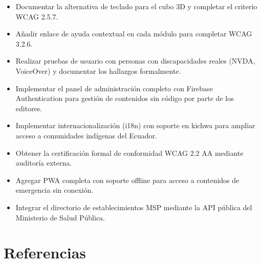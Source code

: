 \documentclass[12pt, a4paper]{report}
\begin{document}
\begin{itemize}
  \item Documentar la alternativa de teclado para el cubo 3D y completar el criterio WCAG 2.5.7.
  \item Añadir enlace de ayuda contextual en cada módulo para completar WCAG 3.2.6.
  \item Realizar pruebas de usuario con personas con discapacidades reales (NVDA, VoiceOver) y documentar los hallazgos formalmente.
  \item Implementar el panel de administración completo con Firebase Authentication para gestión de contenidos sin código por parte de los editores.
  \item Implementar internacionalización (i18n) con soporte en kichwa para ampliar acceso a comunidades indígenas del Ecuador.
  \item Obtener la certificación formal de conformidad WCAG 2.2 AA mediante auditoría externa.
  \item Agregar PWA completa con soporte offline para acceso a contenidos de emergencia sin conexión.
  \item Integrar el directorio de establecimientos MSP mediante la API pública del Ministerio de Salud Pública.
\end{itemize}

\chapter*{Referencias}
\end{document}
